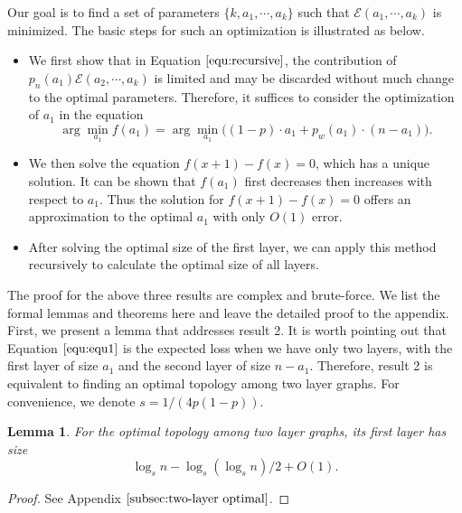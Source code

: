 \documentclass[a4paper,UKenglish]{lipics}
\newtheorem{lem}[thm]{Lemma}
\theoremstyle{definition}
\begin{document}
Our goal is to find a set of parameters $\{k, a_1, \dotsb, a_k\}$ such that $\mathcal{E}(a_1, \dotsb, a_k)$ is minimized.
The basic steps for such an optimization is illustrated as below.
\begin{itemize}
\item We first show that in Equation $\eqref{equ:recursive}$,  
		the contribution of $p_n(a_1)\mathcal{E}(a_2, \dotsb, a_k)$ is limited and 
		may be discarded without much change to the optimal parameters.
	Therefore, it suffices to consider the optimization of $a_1$ in the equation
	\begin{equation}
	\label{equ:equ1}
		\arg\min_{a_1} f(a_1) = \arg\min_{a_1} \Big( (1-p)\cdot a_1 + p_w(a_1)\cdot (n - a_1) \Big).
	\end{equation}
\item We then solve the equation $f(x+1) - f(x) = 0$, which has a unique solution.
	It can be shown that $f(a_1)$ first decreases then increases with respect to $a_1$.
	Thus the solution for $f(x+1) - f(x) = 0$ offers an approximation to the optimal $a_1$ with only $O(1)$ error.
\item After solving the optimal size of the first layer, we can apply this method recursively to calculate the optimal size of all layers.
\end{itemize}

The proof for the above three results are complex and brute-force.
We list the formal lemmas and theorems here and leave the detailed proof to the appendix.
First, we present a lemma that addresses result 2.
It is worth pointing out that Equation $\ref{equ:equ1}$ is the expected loss when we have only two layers,
	with the first layer of size $a_1$ and the second layer of size $n - a_1$.
Therefore, result 2 is equivalent to finding an optimal topology among two layer graphs.
For convenience, we denote $s = 1 / (4p(1-p))$.

\begin{lem}
\label{lem:twolayer}
For the optimal topology among two layer graphs, its first layer has size 
\begin{equation*}
\log_{s}n-\log_s( \log_s n)/2 + O(1).
\end{equation*}
\end{lem}
\begin{proof}
See Appendix $\ref{subsec:two-layer optimal}$.
\end{proof}
\end{document}
